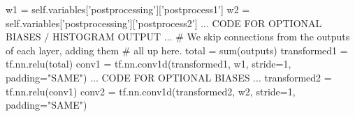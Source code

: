 \documentclass[8pt]{beamer}
\begin{document}
\begin{frame}[fragile]
\begin{columns}
\begin{column}{0.5\textwidth}
 \begin{verbnobox}[\tiny]
    w1 = self.variables['postprocessing']['postprocess1']
    w2 = self.variables['postprocessing']['postprocess2']
    ... CODE FOR OPTIONAL BIASES / HISTOGRAM OUTPUT ...
    # We skip connections from the outputs of each layer, adding them
    # all up here.
    total = sum(outputs)
    transformed1 = tf.nn.relu(total)
    conv1 = tf.nn.conv1d(transformed1, w1, stride=1, padding="SAME")
        ... CODE FOR OPTIONAL BIASES ...
    transformed2 = tf.nn.relu(conv1)
    conv2 = tf.nn.conv1d(transformed2, w2, stride=1, padding="SAME")
\end{verbnobox}

\end{column}
\end{columns} 
 
\end{frame}
\end{document}
